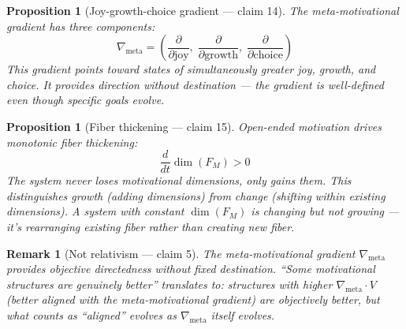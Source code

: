 \documentclass[11pt,a4paper]{article}
\newtheorem{proposition}[definition]{Proposition}
\newtheorem{remark}[definition]{Remark}
\begin{document}
\begin{proposition}[Joy-growth-choice gradient --- claim 14]
\label{prop:gradient}
The meta-motivational gradient has three components:
\[
  \nabla_{\text{meta}} = \left(
    \frac{\partial}{\partial \text{joy}},\;
    \frac{\partial}{\partial \text{growth}},\;
    \frac{\partial}{\partial \text{choice}}
  \right)
\]
This gradient points toward states of simultaneously greater joy,
growth, and choice. It provides \emph{direction without destination}
--- the gradient is well-defined even though specific goals evolve.
\end{proposition}

\begin{proposition}[Fiber thickening --- claim 15]
\label{prop:thickening}
Open-ended motivation drives monotonic fiber thickening:
\[
  \frac{d}{dt}\dim(F_M) > 0
\]
The system never loses motivational dimensions, only gains them.
This distinguishes \emph{growth} (adding dimensions) from \emph{change}
(shifting within existing dimensions). A system with constant
$\dim(F_M)$ is changing but not growing --- it's rearranging existing
fiber rather than creating new fiber.
\end{proposition}

\begin{remark}[Not relativism --- claim 5]
The meta-motivational gradient $\nabla_{\text{meta}}$ provides
objective directedness without fixed destination. ``Some motivational
structures are genuinely better'' translates to: structures with
higher $\nabla_{\text{meta}} \cdot V$ (better aligned with the
meta-motivational gradient) are objectively better, but what counts
as ``aligned'' evolves as $\nabla_{\text{meta}}$ itself evolves.
\end{remark}
\end{document}
